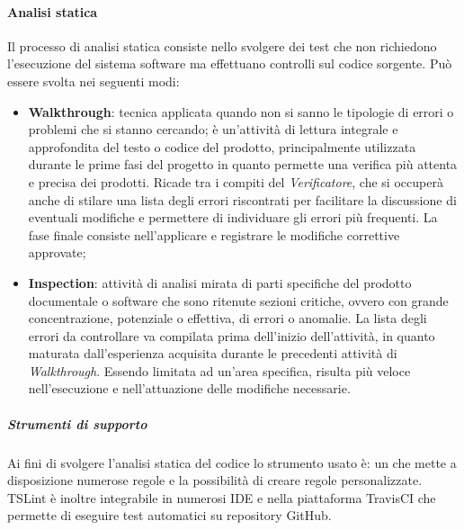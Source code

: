 \paragraph{Analisi statica}\Spazio
Il processo di analisi statica consiste nello svolgere dei test che non richiedono l'esecuzione del sistema software ma effettuano controlli sul codice sorgente. 
Può essere svolta nei seguenti modi:
\begin{itemize}
	\item \textbf{Walkthrough}: tecnica applicata quando non si sanno le tipologie di errori o problemi che si stanno cercando; è un'attività di lettura integrale e approfondita del testo o codice del prodotto, principalmente utilizzata durante le prime fasi del progetto in quanto permette una verifica più attenta e precisa dei prodotti. Ricade tra
	i compiti del \emph{Verificatore}, che si occuperà anche di stilare una
	lista degli errori riscontrati per facilitare la discussione di eventuali modifiche e permettere di individuare gli errori più frequenti. La fase finale consiste nell'applicare e registrare le modifiche correttive approvate;
	\item \textbf{Inspection}: attività di analisi mirata di parti specifiche del prodotto documentale o software che sono ritenute sezioni critiche, ovvero con grande concentrazione, potenziale o effettiva, di errori
	o anomalie. La lista degli errori da controllare va compilata prima dell'inizio dell'attività, in quanto maturata dall'esperienza acquisita durante le precedenti attività di \emph{Walkthrough}.
	Essendo limitata ad un'area specifica, risulta più veloce nell'esecuzione e nell'attuazione delle modifiche necessarie.
\end{itemize}

\subparagraph{Strumenti di supporto}\Spazio
Ai fini di svolgere l'analisi statica del codice lo strumento usato è:  un  che mette a disposizione numerose regole e la possibilità di creare regole personalizzate. TSLint è inoltre integrabile in numerosi IDE e nella piattaforma TravisCI che permette di eseguire test automatici su repository GitHub.
